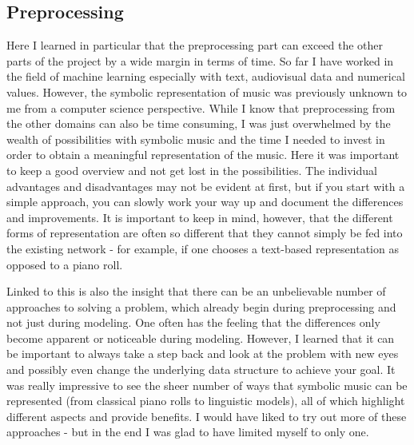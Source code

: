 \documentclass[a4paper, 10pt, xcolor=dvipsnames]{article} %
\begin{document}
\subsection{Preprocessing}
Here I learned in particular that the preprocessing part can
exceed the other parts of the project by a wide margin in terms of time. So far
I have worked in the field of machine learning especially with text,
audiovisual data and numerical values. However, the symbolic representation of
music was previously unknown to me from a computer science perspective. While I
know that preprocessing from the other domains can also be time consuming, I
was just overwhelmed by the wealth of possibilities with symbolic music and the
time I needed to invest in order to obtain a meaningful representation of the
music. Here it was important to keep a good overview and not get lost in the
possibilities. The individual advantages and disadvantages may not be evident
at first, but if you start with a simple approach, you can slowly work your way
up and document the differences and improvements. It is important to keep in
mind, however, that the different forms of representation are often so
different that they cannot simply be fed into the existing network - for
example, if one chooses a text-based representation as opposed to a piano roll.

Linked to this is also the insight that there can be an unbelievable number of
approaches to solving a problem, which already begin during preprocessing and
not just during modeling. One often has the feeling that the differences only
become apparent or noticeable during modeling. However, I learned that it can
be important to always take a step back and look at the problem with new eyes
and possibly even change the underlying data structure to achieve your goal. It
was really impressive to see the sheer number of ways that symbolic music can
be represented (from classical piano rolls to linguistic models), all of which
highlight different aspects and provide benefits. I would have liked to try out
more of these approaches - but in the end I was glad to have limited myself to
only one.
\end{document}
